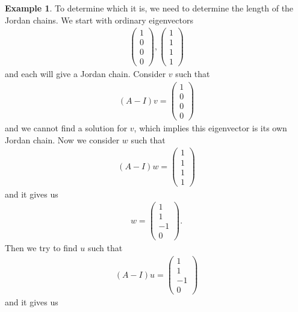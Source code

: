 \documentclass[11pt]{book}
\theoremstyle{definition}
\newtheorem{example}{Example}[section]
\numberwithin{equation}{chapter}
\begin{document}
\begin{example}
To determine which it is, we need to determine the length of the Jordan chains. We start with ordinary eigenvectors
\begin{align*}
    \begin{pmatrix}
    1 \\
    0 \\
    0 \\
    0
    \end{pmatrix}, \begin{pmatrix}
    1 \\
    1 \\
    1 \\
    1
    \end{pmatrix}
\end{align*}
and each will give a Jordan chain. Consider $v$ such that
\begin{align*}
    (A - I)v = \begin{pmatrix}
    1 \\
    0 \\
    0 \\
    0
    \end{pmatrix}
\end{align*}
and we cannot find a solution for $v$, which implies this eigenvector is its own Jordan chain. Now we consider $w$ such that
\begin{align*}
    (A - I)w = \begin{pmatrix}
    1 \\
    1 \\
    1 \\
    1
    \end{pmatrix}
\end{align*}
and it gives us 
\begin{align*}
    w = \begin{pmatrix}
    1 \\
    1 \\
    -1 \\
    0
    \end{pmatrix}.
\end{align*}
Then we try to find $u$ such that
\begin{align*}
    (A - I)u = \begin{pmatrix}
    1 \\
    1 \\
    -1 \\
    0
    \end{pmatrix}
\end{align*}
and it gives us
\begin{align*}

\end{align*}
\end{example}
\end{document}
